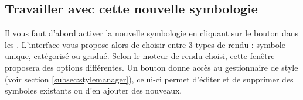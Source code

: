\subsection{Travailler avec cette nouvelle symbologie}

Il vous faut d'abord activer la nouvelle symbologie en cliquant sur le bouton  dans les . L'interface vous propose alors de choisir entre 3 types de rendu : symbole unique, catégorisé ou gradué. Selon le moteur de rendu choisi, cette fenêtre proposera des options différentes. Un bouton  donne accès au gestionnaire de style (voir section \ref{subsec:stylemanager}), celui-ci permet d'éditer et de supprimer des symboles existants ou d'en ajouter des nouveaux.



